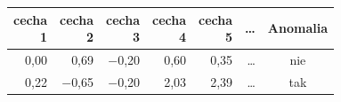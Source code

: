 \begin{tabular}{rrrrrrc}
\toprule
\makecell{cecha\\1} & \makecell{cecha\\2} & \makecell{cecha\\3} & \makecell{cecha\\4} & \makecell{cecha\\5} & \dots & Anomalia \\
\midrule
0,00 & 0,69 & $-$0,20 & 0,60 & 0,35 & \dots & nie \\
0,22 & $-$0,65 & $-$0,20 & 2,03 & 2,39 & \dots & tak \\
\bottomrule
\end{tabular}
